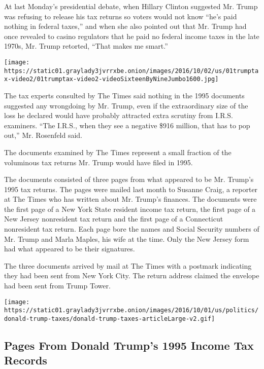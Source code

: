 At last Monday's presidential debate, when Hillary Clinton suggested Mr.
Trump was refusing to release his tax returns so voters would not know
``he's paid nothing in federal taxes,'' and when she also pointed out
that Mr. Trump had once revealed to casino regulators that he paid no
federal income taxes in the late 1970s, Mr. Trump retorted, ``That makes
me smart.''

\texttt{[image: https://static01.graylady3jvrrxbe.onion/images/2016/10/02/us/01trumptax-video2/01trumptax-video2-videoSixteenByNineJumbo1600.jpg]}

The tax experts consulted by The Times said nothing in the 1995
documents suggested any wrongdoing by Mr. Trump, even if the
extraordinary size of the loss he declared would have probably attracted
extra scrutiny from I.R.S. examiners. ``The I.R.S., when they see a
negative \$916 million, that has to pop out,'' Mr. Rosenfeld said.

The documents examined by The Times represent a small fraction of the
voluminous tax returns Mr. Trump would have filed in 1995.

The documents consisted of three pages from what appeared to be Mr.
Trump's 1995 tax returns. The pages were mailed last month to Susanne
Craig, a reporter at The Times who has written about Mr. Trump's
finances. The documents were the first page of a New York State resident
income tax return, the first page of a New Jersey nonresident tax return
and the first page of a Connecticut nonresident tax return. Each page
bore the names and Social Security numbers of Mr. Trump and Marla
Maples, his wife at the time. Only the New Jersey form had what appeared
to be their signatures.

The three documents arrived by mail at The Times with a postmark
indicating they had been sent from New York City. The return address
claimed the envelope had been sent from Trump Tower.

\href{https://www.nytimes3xbfgragh.onion/interactive/2016/10/01/us/politics/donald-trump-taxes.html}{}

\texttt{[image: https://static01.graylady3jvrrxbe.onion/images/2016/10/01/us/politics/donald-trump-taxes/donald-trump-taxes-articleLarge-v2.gif]}

\hypertarget{pages-from-donald-trumps-1995-income-tax-records}{%
\subsection{Pages From Donald Trump's 1995 Income Tax
Records}\label{pages-from-donald-trumps-1995-income-tax-records}}

